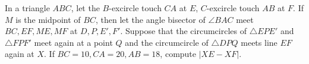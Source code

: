 In a triangle $ABC$, let the $B$-excircle touch $CA$ at $E$, $C$-excircle touch $AB$ at $F$. If $M$ is the midpoint of $BC$, then let the angle bisector of $\angle{BAC}$ meet $BC,EF,ME,MF$ at $D,P,E',F'$. Suppose that the circumcircles of $\triangle{EPE'}$ and $\triangle{FPF'}$ meet again at a point $Q$ and the circumcircle of $\triangle{DPQ}$ meets line $EF$ again at $X$. If $BC=10,CA=20,AB=18$, compute $|XE-XF|$.